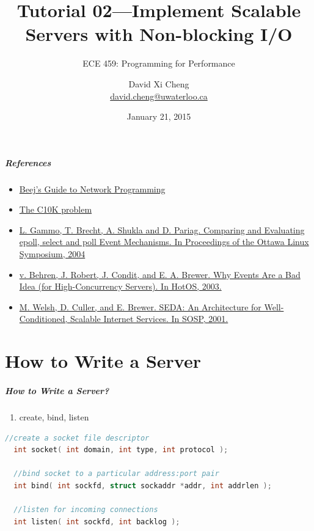 \documentclass[aspectratio=43]{beamer}
\title{Tutorial 02---Implement Scalable Servers with Non-blocking I/O}
\subtitle{ECE 459: Programming for Performance}
\author{David Xi Cheng \\ \href{mailto:david.cheng@uwaterloo.ca}{david.cheng@uwaterloo.ca}}
\institute{University of Waterloo}
\date{January 21, 2015}
\begin{document}
\begin{frame}[plain]
  \titlepage
\end{frame}

\begin{frame}
  \frametitle{References}

  \begin{itemize}
  	\item \href{http://beej.us/guide/bgnet/}{Beej's Guide to Network Programming}
  	\item \href{http://www.kegel.com/c10k.html}{The C10K problem}
	\item \href{https://cs.uwaterloo.ca/~brecht/papers/getpaper.php?file=ols-2004.pdf}{L. Gammo, T. Brecht, A. Shukla and D. Pariag. Comparing and Evaluating epoll, select and poll Event Mechanisms. In Proceedings of the Ottawa Linux Symposium, 2004}
	\item \href{https://www.usenix.org/legacy/events/hotos03/tech/full_papers/vonbehren/vonbehren.pdf}{v. Behren, J. Robert, J. Condit, and E. A. Brewer. Why Events Are a Bad Idea (for High-Concurrency Servers). In HotOS, 2003.}
	\item \href{http://www.eecs.harvard.edu/~mdw/papers/seda-sosp01.pdf}{M. Welsh, D. Culler, and E. Brewer. SEDA: An Architecture for Well-Conditioned, Scalable Internet Services. In SOSP, 2001.}
  \end{itemize}
  \end{frame}

\part{How to Write a Server}
\begin{frame}
\partpage
\end{frame}
\begin{frame}[fragile]
  \frametitle{How to Write a Server?}
  \begin{enumerate}
  	\item create, bind, listen 
  \end{enumerate}
  
  \begin{lstlisting}[language=C,basicstyle=\ttfamily\footnotesize,commentstyle=\color{commgreen},keywordstyle=\color{blue}]
  //create a socket file descriptor
  int socket( int domain, int type, int protocol );
 
  //bind socket to a particular address:port pair
  int bind( int sockfd, struct sockaddr *addr, int addrlen );
  
  //listen for incoming connections
  int listen( int sockfd, int backlog );
  \end{lstlisting}
\end{frame}
\end{document}
